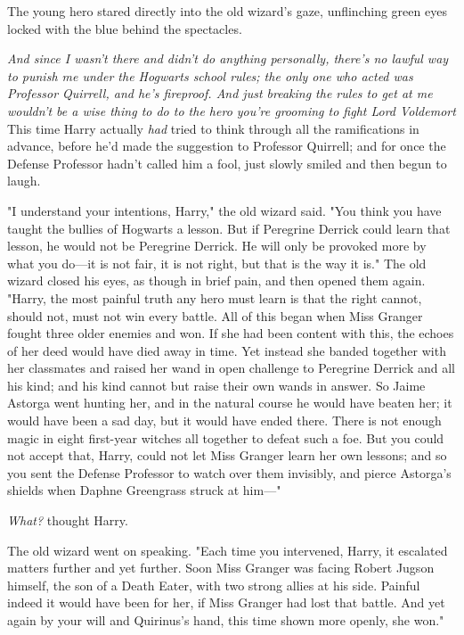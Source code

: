 The young hero stared directly into the old wizard's gaze, unflinching green
eyes locked with the blue behind the spectacles.

\emph{And since I wasn't there and didn't do anything personally, there's no
lawful way to punish me under the Hogwarts school rules; the only one who acted
was Professor Quirrell, and he's fireproof. And just breaking the rules to get
at me wouldn't be a wise thing to do to the hero you're grooming to fight Lord
Voldemort{\el}} This time Harry actually \emph{had} tried to think through
all the ramifications in advance, before he'd made the suggestion to Professor
Quirrell; and for once the Defense Professor hadn't called him a fool, just
slowly smiled and then begun to laugh.

"I understand your intentions, Harry," the old wizard said. "You think you have
taught the bullies of Hogwarts a lesson. But if Peregrine Derrick could learn
that lesson, he would not be Peregrine Derrick. He will only be provoked more
by what you do---it is not fair, it is not right, but that is the way it is."
The old wizard closed his eyes, as though in brief pain, and then opened them
again. "Harry, the most painful truth any hero must learn is that the right
cannot, should not, must not win every battle. All of this began when Miss
Granger fought three older enemies and won. If she had been content with this,
the echoes of her deed would have died away in time. Yet instead she banded
together with her classmates and raised her wand in open challenge to Peregrine
Derrick and all his kind; and his kind cannot but raise their own wands in
answer. So Jaime Astorga went hunting her, and in the natural course he would
have beaten her; it would have been a sad day, but it would have ended there.
There is not enough magic in eight first-year witches all together to defeat
such a foe. But you could not accept that, Harry, could not let Miss Granger
learn her own lessons; and so you sent the Defense Professor to watch over them
invisibly, and pierce Astorga's shields when Daphne Greengrass struck at him---"

\emph{What?} thought Harry.

The old wizard went on speaking. "Each time you intervened, Harry, it escalated
matters further and yet further. Soon Miss Granger was facing Robert Jugson
himself, the son of a Death Eater, with two strong allies at his side. Painful
indeed it would have been for her, if Miss Granger had lost that battle. And
yet again by your will and Quirinus's hand, this time shown more openly, she
won."

